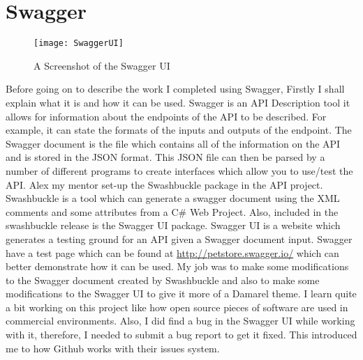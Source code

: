 \section{Swagger}{
		\begin{figure}
	\centering
	\texttt{[image: SwaggerUI]}
	\caption{A Screenshot of the Swagger UI}
	\label{fig:SwaggerUI}
\end{figure}
	Before going on to describe the work I completed using Swagger, Firstly I shall explain what it is and how it can be used. Swagger is an API Description tool it allows for information about the endpoints of the API to be described. For example, it can state the formats of the inputs and outputs of the endpoint. The Swagger document is the file which contains all of the information on the API and is stored in the JSON format. This JSON file can then be parsed by a number of different programs to create interfaces which allow you to use/test the API. Alex my mentor set-up the Swashbuckle package in the API project. Swashbuckle is a tool which can generate a swagger document using the XML comments and some attributes from a C\# Web Project. Also, included in the swashbuckle release is the Swagger UI package. Swagger UI is a website which generates a testing ground for an API given a Swagger document input. Swagger have a test page which can be found at \url{http://petstore.swagger.io/} which can better demonstrate how it can be used. My job was to make some modifications to the Swagger document created by Swashbuckle and also to make some modifications to the Swagger UI to give it more of a Damarel theme. I learn quite a bit working on this project like how open source pieces of software are used in commercial environments. Also, I  did find a bug in the Swagger UI while working with it, therefore, I needed to submit a bug report to get it fixed. This introduced me to how Github works with their issues system.
}